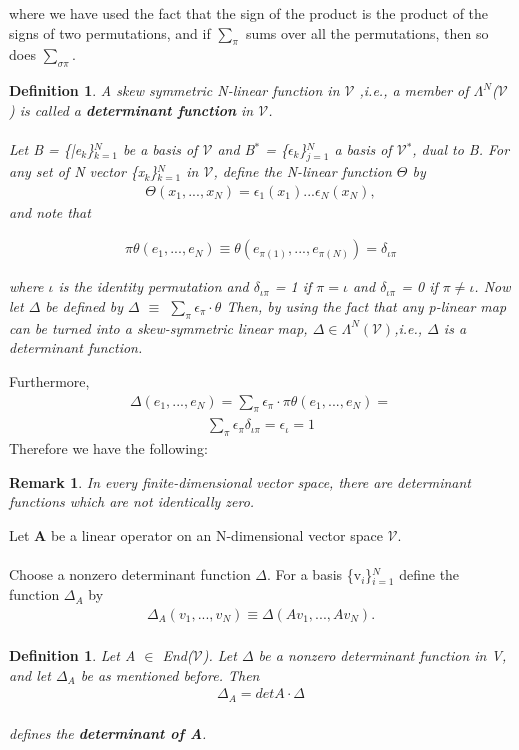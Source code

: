 \documentclass[12pt,a4paper]{article}
\newtheorem{remark}[thm]{Remark}
\newtheorem{defn}[thm]{Definition}
\begin{document}
where we have used the fact that the sign of the product is the product of the
signs of two permutations, and if $\sum_\pi$ sums over all the permutations, then so does $\sum_{\sigma \pi}$.
\begin{defn}
A skew symmetric N-linear function in $\mathcal{V}$ ,i.e., a member of $\Lambda^N$($\mathcal{V}$) is called a \textbf{determinant function} in $\mathcal{V}$.\\\\
Let B = \{|e$_k$\}$^{N}_{k=1}$ be a basis of $\mathcal{V}$ and B$^*$ = \{$\epsilon_k$\}$^N_{j=1}$ a basis of $\mathcal{V}$$^*$, dual to B. For any set of N vector \{x$_k$\}$^N_{k=1}$ in $\mathcal{V}$, define the N-linear function $\Theta$ by 
\begin{align*}
	\Theta(x_1,...,x_N) = \epsilon_1(x_1)...\epsilon_N(x_N),
\end{align*}
and note that 

\begin{align*}
\pi \theta(e_1, ... , e_N) \equiv \theta(e_{\pi(1)}, ... , e_{\pi(N)}) = \delta_{\iota \pi}
\end{align*}

where $\iota$ is the identity permutation and $\delta_{\iota \pi}$ = 1 if $\pi = \iota$ and $\delta_{\iota \pi}$ = 0 if $\pi \ne \iota$.
Now let $\Delta$ be defined by $\Delta$ $\equiv$ $\sum_{\pi}\epsilon_{\pi} \cdot \theta$ Then, by using the fact that any p-linear map can be turned into a skew-symmetric linear map, $\Delta \in \Lambda^N(\mathcal{V})$,i.e., $\Delta$ is a determinant function.
\end{defn}
Furthermore,
\begin{align*}
\Delta( e_1, ... , e_N) = \sum_\pi \epsilon_\pi \cdot \pi \theta (e_1, ... , e_N) =
\end{align*}
\begin{align*}
\sum_\pi \epsilon_\pi \delta_{\iota \pi} = \epsilon_\iota = 1
\end{align*}
Therefore we have the following:
\begin{remark}
In every finite-dimensional vector space, there are determinant functions which are not identically zero.
\end{remark}
Let \textbf{A} be a linear operator on an N-dimensional vector space $\mathcal{V}$. \\ \\Choose a nonzero determinant function $\Delta$. For a basis \{v$_i$\}$^{N}_{i=1}$ define the function $\Delta_A$ by \\ 
\begin{align*}
\Delta_A(v_1,...,v_N) \equiv \Delta(Av_1,...,Av_N). \\
\end{align*}
\begin{defn}
Let A $\in$ End($\mathcal{V}$). Let $\Delta$ be a nonzero determinant function in V, and let $\Delta_A$ be as mentioned before. Then
 \begin{align*}
\Delta_A = det A\cdot \Delta
\end{align*}
\\
defines the \textbf{determinant of A}.\end{defn}
\newpage
\end{document}
